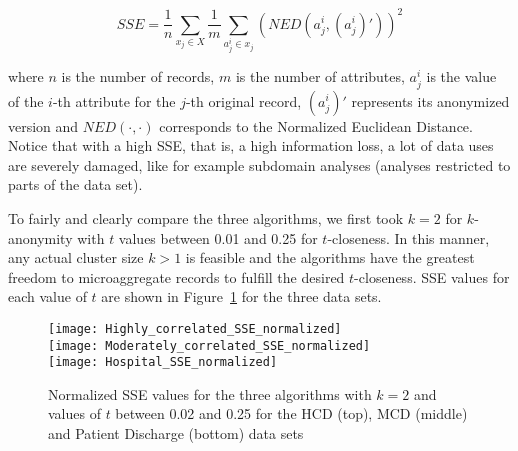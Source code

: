 \documentclass[10pt,journal,compsoc]{IEEEtran}
\theoremstyle{definition}
\theoremstyle{plain}
\begin{document}
\begin{equation}
\label{SSE}
SSE = \frac{1}{n} \sum_{x_{j} \in X} \frac{1}{m} \sum_{a_{j}^{i} \in x_{j}} (NED(a_{j}^{i},(a_{j}^{i})'))^2 
\end{equation}

where $n$ is the number of records, $m$ is the number of attributes,
 $a_{j}^{i}$ is the value of the $i$-th attribute
for the $j$-th original record, $(a_{j}^{i})'$ represents its 
anonymized version and
$NED(\cdot,\cdot)$ corresponds to the Normalized Euclidean Distance.
Notice that with a high SSE, that is, a high information loss, 
a lot of data uses are severely damaged, like
for example subdomain analyses (analyses restricted to parts of the data set).   

To fairly and clearly compare the three algorithms, we first took $k=2$ for $k$-anonymity
with $t$ values between 0.01 and 0.25 for $t$-closeness. 
In this manner, any actual cluster size $k > 1$ is feasible 
and the algorithms have the
greatest freedom to microaggregate records to fulfill the desired $t$-closeness.
SSE values for each value of $t$ are shown in Figure~\ref{fig:SSE} for the three data sets. 

\begin{figure}[!t]
\begin{centering}
	\texttt{[image: Highly\_correlated\_SSE\_normalized]}\\
	\vspace{0.2cm}	
\texttt{[image: Moderately\_correlated\_SSE\_normalized]}\\
	\vspace{0.2cm}
	\texttt{[image: Hospital\_SSE\_normalized]}\\
	\vspace{0.2cm}
\par\end{centering}
\protect\caption{Normalized SSE values for the three algorithms with $k=2$ 
and values of $t$ between 0.02 and 0.25 for the HCD (top), MCD (middle) and 
Patient Discharge (bottom) data sets\label{fig:SSE}}
	\end{figure}
\end{document}
